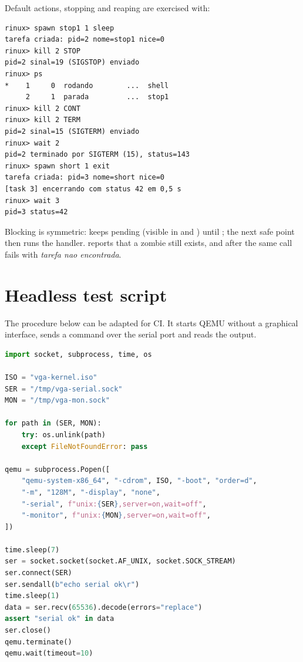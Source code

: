 Default actions, stopping and reaping are exercised with:

\begin{lstlisting}[style=shell,caption={Default actions, SIGSTOP/SIGCONT and wait.},label={lst:testlifecycle}]
rinux> spawn stop1 1 sleep
tarefa criada: pid=2 nome=stop1 nice=0
rinux> kill 2 STOP
pid=2 sinal=19 (SIGSTOP) enviado
rinux> ps
*    1     0  rodando        ...  shell
     2     1  parada         ...  stop1
rinux> kill 2 CONT
rinux> kill 2 TERM
pid=2 sinal=15 (SIGTERM) enviado
rinux> wait 2
pid=2 terminado por SIGTERM (15), status=143
rinux> spawn short 1 exit
tarefa criada: pid=3 nome=short nice=0
[task 3] encerrando com status 42 em 0,5 s
rinux> wait 3
pid=3 status=42
\end{lstlisting}

Blocking is symmetric:  keeps 
pending (visible in  and ) until
; the next safe point then runs the handler.
 reports that a zombie still exists, and after
 the same call fails with \emph{tarefa nao encontrada}.

\section{Headless test script}

The procedure below can be adapted for CI. It starts QEMU without a
graphical interface, sends a command over the serial port and reads the
output.

\begin{lstlisting}[language=Python,caption={Headless test skeleton with a serial socket.},label={lst:testscript}]
import socket, subprocess, time, os

ISO = "vga-kernel.iso"
SER = "/tmp/vga-serial.sock"
MON = "/tmp/vga-mon.sock"

for path in (SER, MON):
    try: os.unlink(path)
    except FileNotFoundError: pass

qemu = subprocess.Popen([
    "qemu-system-x86_64", "-cdrom", ISO, "-boot", "order=d",
    "-m", "128M", "-display", "none",
    "-serial", f"unix:{SER},server=on,wait=off",
    "-monitor", f"unix:{MON},server=on,wait=off",
])

time.sleep(7)
ser = socket.socket(socket.AF_UNIX, socket.SOCK_STREAM)
ser.connect(SER)
ser.sendall(b"echo serial ok\r")
time.sleep(1)
data = ser.recv(65536).decode(errors="replace")
assert "serial ok" in data
ser.close()
qemu.terminate()
qemu.wait(timeout=10)
\end{lstlisting}

